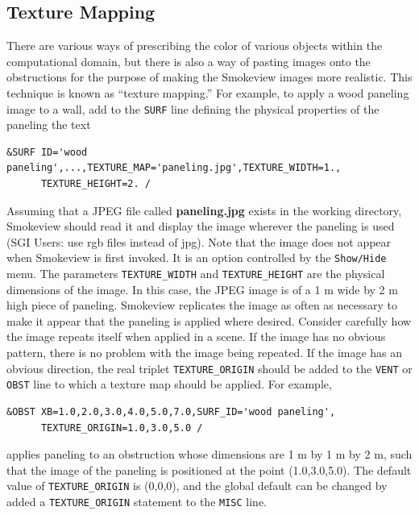 \documentclass[11pt]{book}
\newcommand{\ct}{\tt\small}
\begin{document}
\subsection{Texture Mapping}
\label{info:texture_map}
There are various ways of prescribing the color of various objects
within the computational domain, but there is also a way of pasting
images onto the obstructions for the purpose of making the Smokeview
images more realistic. This technique is known as ``texture mapping.''
For example, to apply a wood paneling image to a wall,
add to the {\ct SURF} line defining the physical properties of the
paneling the text

\footnotesize
\begin{verbatim}
&SURF ID='wood paneling',...,TEXTURE_MAP='paneling.jpg',TEXTURE_WIDTH=1.,
      TEXTURE_HEIGHT=2. /
\end{verbatim}
\normalsize
Assuming that a JPEG file called {\bf paneling.jpg} exists in the
working directory, Smokeview should read it and display the image
wherever the paneling is used (SGI Users: use rgb files instead of jpg).
Note that the image does not appear when Smokeview is first invoked. It is an option controlled by
the {\ct Show/Hide} menu. The parameters {\ct TEXTURE\_WIDTH}
and {\ct TEXTURE\_HEIGHT} are the physical dimensions of the image.
  In this case,
the JPEG image is of a 1 m wide by 2 m high piece of
paneling. Smokeview replicates the image as often as necessary to
make it appear that the paneling is applied where desired.
Consider carefully how the image repeats itself when
applied in a scene. If the image has no obvious pattern, there is no
problem with the image being repeated. If the image has an obvious
direction, the real triplet {\ct TEXTURE\_ORIGIN} should be added to
the {\ct VENT} or {\ct OBST} line to which a texture map
should be applied. For example,

\footnotesize
\begin{verbatim}
&OBST XB=1.0,2.0,3.0,4.0,5.0,7.0,SURF_ID='wood paneling',
      TEXTURE_ORIGIN=1.0,3.0,5.0 /
\end{verbatim}
\normalsize
applies paneling to an obstruction whose dimensions are 1 m by
1 m by 2 m, such that the image of the paneling is positioned
at the point (1.0,3.0,5.0). The default value of {\ct TEXTURE\_ORIGIN}
is (0,0,0), and the global default can be changed by added a
{\ct TEXTURE\_ORIGIN} statement to the {\ct MISC} line.
\end{document}
